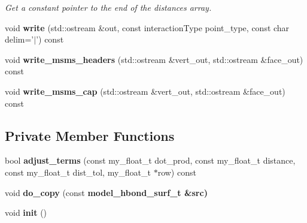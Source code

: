 \begin{CompactItemize}
\begin{CompactList}\small\item\em Get a constant pointer to the end of the distances array. \item\end{CompactList}\item 
void \textbf{write} (std::ostream \&out, const interaction\-Type point\_\-type, const char delim='$|$') const \label{classASCbase_1_1model__hbond__surf__t_2c3b46d219e290bd39bf60cdc9210fcc}

\item 
void \textbf{write\_\-msms\_\-headers} (std::ostream \&vert\_\-out, std::ostream \&face\_\-out) const \label{classASCbase_1_1model__hbond__surf__t_ac5245563487a78bec4f41d973dae1ef}

\item 
void \textbf{write\_\-msms\_\-cap} (std::ostream \&vert\_\-out, std::ostream \&face\_\-out) const \label{classASCbase_1_1model__hbond__surf__t_b7a5a82b5ba33c13c2f1fde5e2c68e93}

\end{CompactItemize}
\subsection*{Private Member Functions}
\begin{CompactItemize}
\item 
bool \textbf{adjust\_\-terms} (const my\_\-float\_\-t dot\_\-prod, const my\_\-float\_\-t distance, const my\_\-float\_\-t dist\_\-tol, my\_\-float\_\-t $\ast$row) const \label{classASCbase_1_1model__hbond__surf__t_258b7159aac2ffbbe568db054127092f}

\item 
void \textbf{do\_\-copy} (const \bf{model\_\-hbond\_\-surf\_\-t} \&src)\label{classASCbase_1_1model__hbond__surf__t_695c87b6533ec81d5780c82fff1a6aed}

\item 
void \textbf{init} ()\label{classASCbase_1_1model__hbond__surf__t_864c86053b4b227a58f820bb73d46064}

\end{CompactItemize}
